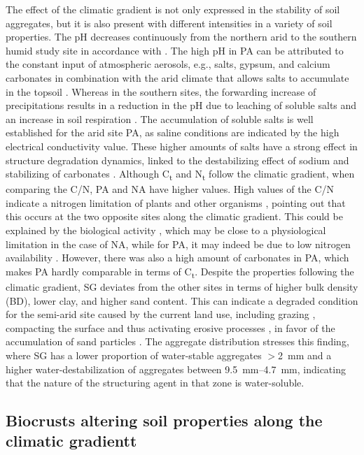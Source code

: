 The effect of the climatic gradient is not only expressed in the stability of soil aggregates, but it is also present with different intensities in a variety of soil properties. The pH decreases continuously from the northern arid to the southern humid study site in accordance with \citet{Bernhard2018}. The high pH in PA can be attributed to the constant input of atmospheric aerosols, e.g., salts, gypsum, and calcium carbonates \citep{Ewing2006} in combination with the arid climate that allows salts to accumulate in the topsoil \citep{Slessarev2016}. Whereas in the southern sites, the forwarding increase of precipitations results in a reduction in the pH due to leaching of soluble salts \citep{Slessarev2016} and an increase in soil respiration \citep{Orchard1983}. The accumulation of soluble salts is well established for the arid site PA, as saline conditions \citep{Allison1954} are indicated by the high electrical conductivity value. These higher amounts of salts have a strong effect in structure degradation dynamics, linked to the destabilizing effect of sodium and stabilizing of carbonates \citep{Corwin2021}. Although C\textsubscript{t} and N\textsubscript{t} follow the climatic gradient, when comparing the C/N, PA and NA have higher values. High values of the C/N indicate a nitrogen limitation of plants and other organisms \citep{Brust2019}, pointing out that this occurs at the two opposite sites along the climatic gradient. This could be explained by the biological activity \citep{Zhang2013}, which may be close to a physiological limitation in the case of NA, while for PA, it may indeed be due to low nitrogen availability \citep{Hooper1999}. However, there was also a high amount of carbonates in PA, which makes PA hardly comparable in terms of C\textsubscript{t}. Despite the properties following the climatic gradient, SG deviates from the other sites in terms of higher bulk density (BD), lower clay, and higher sand content. This can indicate a degraded condition for the semi-arid site caused by the current land use, including grazing \citep{Armesto2007}, compacting the surface and thus activating erosive processes \citep{Scholten2019}, in favor of the accumulation of sand particles \citep{Govers1985}. The aggregate distribution stresses this finding, where SG has a lower proportion of water-stable aggregates $>$\SI{2}{\milli\meter} and a higher water-destabilization of aggregates between \SIrange{9.5}{4.7}{\milli\meter}, indicating that the nature of the structuring agent in that zone is water-soluble.

\subsection{Biocrusts altering soil properties along the climatic gradientt}

